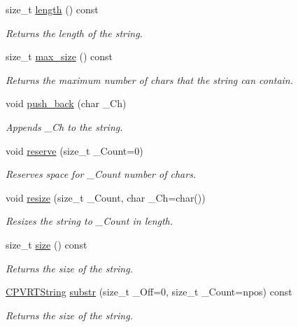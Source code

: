 \begin{DoxyCompactItemize}
size\+\_\+t \hyperlink{class_c_p_v_r_t_string_ae3548c03219a9ddc367c64de48231bf9}{length} () const 
\begin{DoxyCompactList}\small\item\em Returns the length of the string. \end{DoxyCompactList}\item 
size\+\_\+t \hyperlink{class_c_p_v_r_t_string_a97b2ae01970a0a42a9dd368c026f73de}{max\+\_\+size} () const 
\begin{DoxyCompactList}\small\item\em Returns the maximum number of chars that the string can contain. \end{DoxyCompactList}\item 
void \hyperlink{class_c_p_v_r_t_string_aec4d14f780fb60781558da44fb5187c5}{push\+\_\+back} (char \+\_\+\+Ch)
\begin{DoxyCompactList}\small\item\em Appends \+\_\+\+Ch to the string. \end{DoxyCompactList}\item 
void \hyperlink{class_c_p_v_r_t_string_a073a2ea4628b55e63a0cab38e0c4996c}{reserve} (size\+\_\+t \+\_\+\+Count=0)
\begin{DoxyCompactList}\small\item\em Reserves space for \+\_\+\+Count number of chars. \end{DoxyCompactList}\item 
void \hyperlink{class_c_p_v_r_t_string_a69df81652ae94c401c2c7071e827789e}{resize} (size\+\_\+t \+\_\+\+Count, char \+\_\+\+Ch=char())
\begin{DoxyCompactList}\small\item\em Resizes the string to \+\_\+\+Count in length. \end{DoxyCompactList}\item 
size\+\_\+t \hyperlink{class_c_p_v_r_t_string_afbdb5fbf9e15ecf80cc7b4338854cb5e}{size} () const 
\begin{DoxyCompactList}\small\item\em Returns the size of the string. \end{DoxyCompactList}\item 
\hyperlink{class_c_p_v_r_t_string}{C\+P\+V\+R\+T\+String} \hyperlink{class_c_p_v_r_t_string_a626210697c8a0b65b9245693c5f21d15}{substr} (size\+\_\+t \+\_\+\+Off=0, size\+\_\+t \+\_\+\+Count=npos) const 
\begin{DoxyCompactList}\small\item\em Returns the size of the string. \end{DoxyCompactList}\item 

\end{DoxyCompactItemize}

